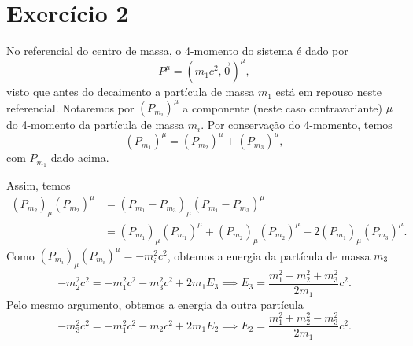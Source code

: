 \section*{Exercício 2}
No referencial do centro de massa, o 4-momento do sistema é dado por
\begin{equation*}
    P^\mu = \left(m_1c^2, \vec{0}\right)^\mu,
\end{equation*}
visto que antes do decaimento a partícula de massa \(m_1\) está em repouso neste referencial. Notaremos por \(\left(P_{m_i}\right)^\mu\) a componente (neste caso contravariante) \(\mu\) do 4-momento da partícula de massa \(m_i\). Por conservação do 4-momento, temos
\begin{equation*}
    \left(P_{m_1}\right)^\mu = \left(P_{m_2}\right)^\mu + \left(P_{m_3}\right)^\mu,
\end{equation*}
com \(P_{m_1}\) dado acima.

Assim, temos
\begin{align*}
    \left(P_{m_2}\right)_\mu \left(P_{m_2}\right)^\mu &= \left(P_{m_1} - P_{m_3}\right)_\mu\left(P_{m_1}-P_{m_3}\right)^\mu\\
                                                      &= \left(P_{m_1}\right)_\mu\left(P_{m_1}\right)^\mu + \left(P_{m_2}\right)_\mu\left(P_{m_2}\right)^\mu - 2\left(P_{m_1}\right)_\mu\left(P_{m_3}\right)^\mu.
\end{align*}
Como \(\left(P_{m_i}\right)_\mu \left(P_{m_i}\right)^\mu = -m_i^2c^2\), obtemos a energia da partícula de massa \(m_3\)
\begin{equation*}
    -m_2^2c^2 = -m_1^2c^2 - m_3^2c^2 + 2 m_1 E_3 \implies E_3 = \frac{m_1^2 -m_2^2 + m_3^2}{2m_1}c^2.
\end{equation*}
Pelo mesmo argumento, obtemos a energia da outra partícula
\begin{equation*}
    -m_3^2c^2 = -m_1^2 c^2 - m_2c^2 + 2m_1E_2 \implies E_2 = \frac{m_1^2 + m_2^2 - m_3^2}{2m_1}c^2.
\end{equation*}
